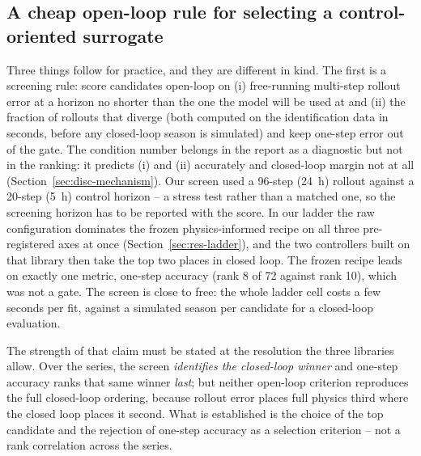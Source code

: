 \subsection{A cheap open-loop rule for selecting a control-oriented surrogate}
\label{sec:disc-rule}

Three things follow for practice, and they are different in kind. The first is a
screening rule: score candidates open-loop on (i) free-running multi-step rollout
error at a horizon no shorter than the one the model will be used at and (ii) the
fraction of rollouts that diverge (both computed on the identification data in seconds, before any closed-loop season is simulated) and keep one-step error out
of the gate. The condition number belongs in the report as a diagnostic but not in
the ranking: it predicts (i) and (ii) accurately and closed-loop margin not at all
(Section~\ref{sec:disc-mechanism}). Our screen used a 96-step (24~h) rollout against a 20-step
(5~h) control horizon -- a stress test rather than a matched one, so the screening
horizon has to be reported with the score. In our ladder the
raw configuration dominates the frozen physics-informed recipe on all three
pre-registered axes at once (Section~\ref{sec:res-ladder}), and the two
controllers built on that library then take the top two places in closed loop.
The frozen recipe leads on exactly one metric, one-step accuracy (rank 8 of 72
against rank 10), which was not a gate. The screen is close to free: the whole
ladder cell costs a few seconds per fit, against a simulated season per candidate
for a closed-loop evaluation.

The strength of that claim must be stated at the resolution the three libraries
allow. Over the series, the screen \emph{identifies the closed-loop winner} and
one-step accuracy ranks that same winner \emph{last}; but neither open-loop
criterion reproduces the full closed-loop ordering, because rollout error places
full physics third where the closed loop places it second. What is established is
the choice of the top candidate and the rejection of one-step accuracy as a
selection criterion -- not a rank correlation across the series.

